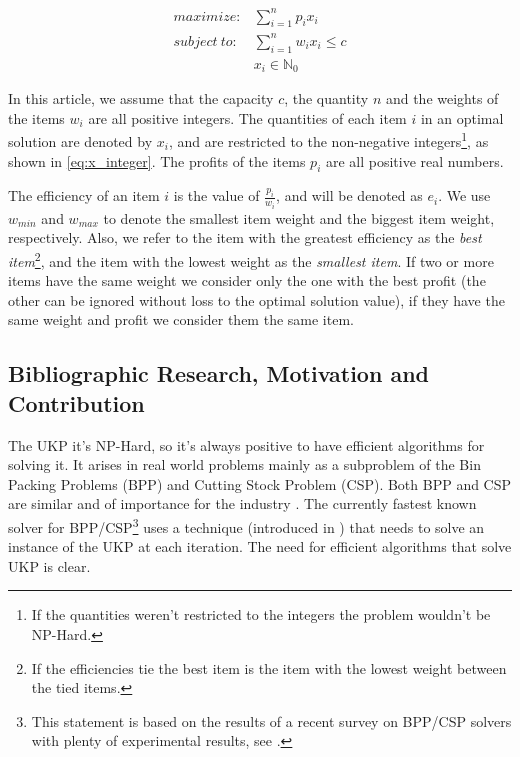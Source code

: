 \documentclass[runningheads,a4paper]{llncs}
\begin{document}
\begin{align}
  maximize: &\sum_{i=1}^n p_i x_i\label{eq:objfun}\\
subject~to: &\sum_{i=1}^n w_i x_i \leq c\label{eq:capcons}\\
            &x_i \in \mathbb{N}_0\label{eq:x_integer}
\end{align}

In this article, we assume that the capacity \(c\), the quantity \(n\) and the weights of the items \(w_i\) are all positive integers. The quantities of each item \(i\) in an optimal solution are denoted by \(x_i\), and are restricted to the non-negative integers\footnote{If the quantities weren't restricted to the integers the problem wouldn't be NP-Hard.}, as shown in \eqref{eq:x_integer}. The profits of the items \(p_i\) are all positive real numbers.

The efficiency of an item \(i\) is the value of \(\frac{p_i}{w_i}\), and will be denoted as \(e_i\). We use \(w_{min}\) and \(w_{max}\) to denote the smallest item weight and the biggest item weight, respectively. Also, we refer to the item with the greatest efficiency as the \emph{best item}\footnote{If the efficiencies tie the best item is the item with the lowest weight between the tied items.}, and the item with the lowest weight as the \emph{smallest item}. If two or more items have the same weight we consider only the one with the best profit (the other can be ignored without loss to the optimal solution value), if they have the same weight and profit we consider them the same item.

\subsection{Bibliographic Research, Motivation and Contribution}

The UKP it's NP-Hard, so it's always positive to have efficient algorithms for solving it. It arises in real world problems mainly as a subproblem of the Bin Packing Problems (BPP) and Cutting Stock Problem (CSP). Both BPP and CSP are similar and of importance for the industry \cite{CSURVEY} \cite{CGG} \cite{CGG2}. The currently fastest known solver for BPP/CSP\footnote{This statement is based on the results of a recent survey on BPP/CSP solvers with plenty of experimental results, see \cite{CSURVEY}.} uses a technique (introduced in \cite{CGG}) that needs to solve an instance of the UKP at each iteration. The need for efficient algorithms that solve UKP is clear.
\end{document}

